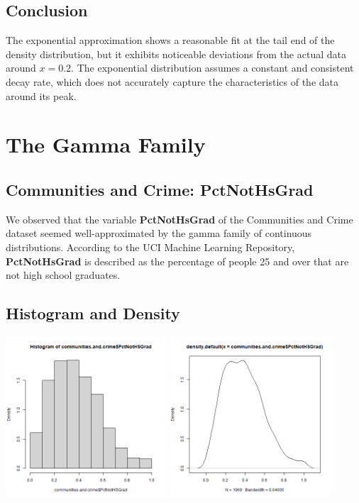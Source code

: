 \documentclass[12pt, letterpaper]{report}
\begin{document}
\section{Conclusion}
The exponential approximation shows a reasonable fit at the tail end of the density distribution, but it exhibits noticeable deviations from the actual data around \(x=0.2\). 
The exponential distribution assumes a constant and consistent decay rate, which does not accurately capture the characteristics of the data around its peak.

\maketitle
\chapter{The Gamma Family}
\section{Communities and Crime: PctNotHsGrad}

We observed that the variable \textbf{PctNotHsGrad} of the Communities and Crime dataset seemed well-approximated by the gamma family of continuous distributions.
According to the UCI Machine Learning Repository, \textbf{PctNotHsGrad} is described as the percentage of people 25 and over that are not high school graduates.


\section{Histogram and Density}


\begin{center}
\includegraphics[width=0.45\textwidth]{gamma/PctNotHsGrad_hist}
\includegraphics[width=0.45\textwidth]{gamma/PctNotHsGrad_density}
\end{center}
\end{document}
